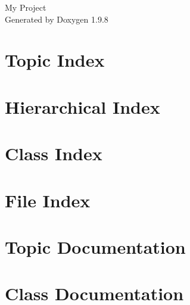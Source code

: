 \documentclass[twoside]{book}
\newcommand{\+}{\discretionary{\mbox{\scriptsize$\hookleftarrow$}}{}{}}
\newcommand{\clearemptydoublepage}{%
    \newpage{\pagestyle{empty}\cleardoublepage}%
  }
\begin{document}
  \raggedbottom
    \hypersetup{pageanchor=false,
                bookmarksnumbered=true,
                pdfencoding=unicode
               }
  \begin{titlepage}
  \vspace*{7cm}
  \begin{center}%
  {\Large My Project}\\
  \vspace*{1cm}
  {\large Generated by Doxygen 1.9.8}\\
  \end{center}
  \end{titlepage}
  \clearemptydoublepage
  \tableofcontents
  \clearemptydoublepage
  \hypersetup{pageanchor=true}


\chapter{Topic Index}

\chapter{Hierarchical Index}

\chapter{Class Index}

\chapter{File Index}

\chapter{Topic Documentation}










\chapter{Class Documentation}

















\end{document}

